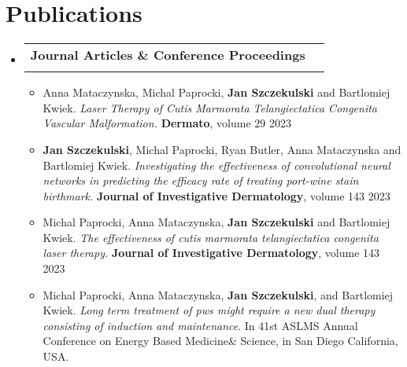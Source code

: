 \documentclass[letterpaper,11pt]{article}
\makeatletter
\newcommand{\resumeItem}[1]{
  \item\small{
    {#1 \vspace{-2pt}}
  }
}
\newcommand{\resumeSubheading}[4]{
  \vspace{-2pt}\item
    \begin{tabular*}{1.0\textwidth}[t]{l@{\extracolsep{\fill}}r}
      \textbf{#1} & \textbf{\small #2} \\
      \textit{\small#3} & \textit{\small #4} \\
    \end{tabular*}\vspace{-7pt}
}
\newcommand{\resumeSubHeadingListStart}{\begin{itemize}[leftmargin=0.0in, label={}]}
\newcommand{\resumeSubHeadingListEnd}{\end{itemize}}
\newcommand{\resumeItemListStart}{\begin{itemize}}
\newcommand{\resumeItemListEnd}{\end{itemize}\vspace{-5pt}}
\makeatother
\begin{document}
\section{Publications}
    \resumeSubHeadingListStart
        \resumeSubheading{Journal Articles \& Conference Proceedings}{}{}{}
            \resumeItemListStart
                \resumeItem{Anna Mataczynska, Michal Paprocki, \textbf{Jan Szczekulski} and Bartlomiej Kwiek. \textit{Laser Therapy of Cutis Marmorata Telangiectatica Congenita Vascular Malformation.} \textbf{Dermato}, volume 29 2023}
                \vspace{3pt}
                \resumeItem{\textbf{Jan Szczekulski}, Michal Paprocki, Ryan Butler, Anna Mataczynska and Bartlomiej Kwiek. \textit{Investigating the effectiveness of convolutional neural networks in predicting the efficacy rate of treating port-wine stain birthmark.} \textbf{Journal of Investigative Dermatology}, volume 143 2023}
                \vspace{3pt}
                \resumeItem{Michal Paprocki, Anna Mataczynska, \textbf{Jan Szczekulski} and Bartlomiej Kwiek. \textit{The effectiveness of cutis marmorata telangiectatica congenita laser therapy.} \textbf{Journal of Investigative Dermatology}, volume 143 2023}
                \vspace{3pt}
                \resumeItem{Michal Paprocki, Anna Mataczynska, \textbf{Jan Szczekulski}, and Bartlomiej Kwiek. \textit{Long term treatment of pws might require a new dual therapy consisting of induction and maintenance}. In 41st ASLMS Annual Conference on Energy Based Medicine\& Science, in San Diego California, USA.}
            \resumeItemListEnd
    \resumeSubHeadingListEnd

\end{document}
